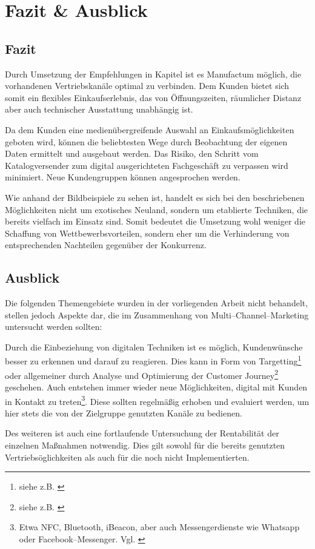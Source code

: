 \section{Fazit \& Ausblick}

\subsection{Fazit}

Durch Umsetzung der Empfehlungen in Kapitel  ist es Manufactum möglich, die vorhandenen Vertriebskanäle optimal zu verbinden. Dem Kunden bietet sich somit ein flexibles Einkaufserlebnis, das von Öffnungszeiten, räumlicher Distanz aber auch technischer Ausstattung unabhängig ist. 

Da dem Kunden eine medienübergreifende Auswahl an Einkaufsmöglichkeiten geboten wird, können die beliebtesten Wege durch Beobachtung der eigenen Daten ermittelt und ausgebaut werden. Das Risiko, den Schritt vom Katalogversender zum digital ausgerichteten Fachgeschäft zu verpassen wird minimiert. Neue Kundengruppen können angesprochen werden.

Wie anhand der Bildbeispiele zu sehen ist, handelt es sich bei den beschriebenen Möglichkeiten nicht um exotisches Neuland, sondern um etablierte Techniken, die bereits vielfach im Einsatz sind. Somit bedeutet die Umsetzung wohl weniger die Schaffung von Wettbewerbsvorteilen, sondern eher um die Verhinderung von entsprechenden Nachteilen gegenüber der Konkurrenz.

\subsection{Ausblick}

Die folgenden Themengebiete wurden in der vorliegenden Arbeit nicht behandelt, stellen jedoch Aspekte dar, die im Zusammenhang von Multi--Channel--Marketing untersucht werden sollten:

Durch die Einbeziehung von digitalen Techniken ist es möglich, Kundenwünsche besser zu erkennen und darauf zu reagieren. Dies kann in Form von Targetting\footnote{siehe z.B. \cite{omptarget}} oder allgemeiner durch Analyse und Optimierung der Customer Journey\footnote{siehe z.B. \cite{ompcj}} geschehen. Auch entstehen immer wieder neue Möglichkeiten, digital mit Kunden in Kontakt zu treten\footnote{Etwa NFC, Bluetooth, iBeacon, aber auch Messengerdienste wie Whatsapp oder Facebook--Messenger. Vgl. \cite{waidele}}. Diese sollten regelmäßig erhoben und evaluiert werden, um hier stets die von der Zielgruppe genutzten Kanäle zu bedienen.


Des weiteren ist auch eine fortlaufende Untersuchung der Rentabilität der einzelnen Maßnahmen notwendig. Dies gilt sowohl für die bereits genutzten Vertriebsöglichkeiten als auch für die noch nicht Implementierten.
